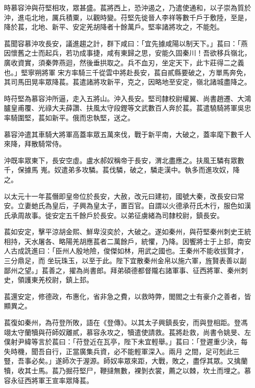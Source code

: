 \begin{pinyinscope}
 時慕容沖與苻堅相攻，眾甚盛。萇將西上，恐沖遏之，乃遣使通和，以子崇為質於沖，進屯北地，厲兵積粟，以觀時變。苻堅先徙晉人李祥等數千戶于敷陸，至是，降於萇，北地、新平、安定羌胡降者十餘萬戶。堅率諸將攻之，不能剋。



 萇聞容慕沖攻長安，議進趨之計，群下咸曰：「宜先據咸陽以制天下。」萇曰：「燕因懷舊之士而起兵，若功成事捷，咸有東歸之思，安能久固秦川！吾欲移兵嶺北，廣收資實，須秦弊燕迴，然後垂拱取之。兵不血刃，坐定天下，此卞莊得二之義也。」堅寧朔將軍
 宋方率騎三千從雲中將赴長安，萇自貳縣要破之，方單馬奔免，其司馬田晃率眾降萇。萇遣諸將攻新平，克之，因略地至安定，嶺北諸城盡降之。



 時苻堅為慕容沖所逼，走入五將山。沖入長安。堅司隸校尉權翼、尚書趙遷、大鴻臚皇甫覆、光祿大夫薛讚、扶風太守段鏗等文武數百人奔於萇。萇遣驍騎將軍吳忠率騎圍堅，萇如新平。俄而忠執堅，送之。



 慕容沖遣其車騎大將軍高蓋率眾五萬來伐，戰于新平南，大破之，蓋率麾下數千人來降，拜散騎常侍。



 沖既率眾東下，長安空虛。盧水郝奴稱帝于長安，渭北盡應之。扶風王驎有眾數千，保據馬
 嵬。奴遣弟多攻驎。萇伐驎，破之，驎走漢中。執多而進攻奴，降之。



 以太元十一年萇僭即皇帝位於長安，大赦，改元曰建初，國號大秦，改長安曰常安。立妻虵氏為皇后，子興為皇太子，置百官。自謂以火德承苻氏木行，服色如漢氏承周故事。徙安定五千餘戶於長安。以弟征虜緒為司隸校尉，鎮長安。



 萇如安定，擊平涼胡金熙、鮮卑沒奕於，大破之。遂如秦州，與苻堅秦州刺史王統相持，天水屠各、略陽羌胡應萇者二萬餘戶，統懼，乃降。因饗將士于上邽，南安人古成詵進曰：「臣州人殷地險，俊傑如林，用武之國也。王秦州不能收拔賢才，三分鼎足，而
 坐玩珠玉，以至于此。陛下宜散秦州金帛以施六軍，旌賢表善以副鄙州之望。」萇善之，擢為尚書郎。拜弟碩德都督隴右諸軍事、征西將軍、秦州刺史，領護東羌校尉，鎮上邽。



 萇還安定，修德政，布惠化，省非急之費，以救時弊，閭閻之士有豪介之善者，皆顯異之。



 萇復如秦州，為苻登所敗，語在《登傳》。以其太子興鎮長安，而與登相距。登馮翊太守蘭犢與苻師奴離貳，慕容永攻之，犢遣使請救。萇將赴救，尚書令姚旻、左僕射尹緯等言於萇曰：「苻登近在瓦亭，陛下未宜輕舉。」萇曰：「登遲重少決，每失時機，聞吾自行，正當廣集兵資，必不能輕軍深入。兩月
 之間，足可剋此三豎，吾事必矣。」遂師次于渥源。師奴率眾來距，大戰，敗之，盡俘其眾。又擒蘭犢，收其士馬。萇乃掘苻堅尸，鞭撻無數，裸剝衣裳，薦之以棘，坎土而埋之。慕容永征西將軍王宣率眾降萇。




\end{pinyinscope}
